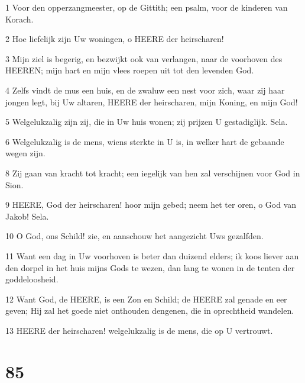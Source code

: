 \par 1 Voor den opperzangmeester, op de Gittith; een psalm, voor de kinderen van Korach.
\par 2 Hoe liefelijk zijn Uw woningen, o HEERE der heirscharen!
\par 3 Mijn ziel is begerig, en bezwijkt ook van verlangen, naar de voorhoven des HEEREN; mijn hart en mijn vlees roepen uit tot den levenden God.
\par 4 Zelfs vindt de mus een huis, en de zwaluw een nest voor zich, waar zij haar jongen legt, bij Uw altaren, HEERE der heirscharen, mijn Koning, en mijn God!
\par 5 Welgelukzalig zijn zij, die in Uw huis wonen; zij prijzen U gestadiglijk. Sela.
\par 6 Welgelukzalig is de mens, wiens sterkte in U is, in welker hart de gebaande wegen zijn.
\par 8 Zij gaan van kracht tot kracht; een iegelijk van hen zal verschijnen voor God in Sion.
\par 9 HEERE, God der heirscharen! hoor mijn gebed; neem het ter oren, o God van Jakob! Sela.
\par 10 O God, ons Schild! zie, en aanschouw het aangezicht Uws gezalfden.
\par 11 Want een dag in Uw voorhoven is beter dan duizend elders; ik koos liever aan den dorpel in het huis mijns Gods te wezen, dan lang te wonen in de tenten der goddeloosheid.
\par 12 Want God, de HEERE, is een Zon en Schild; de HEERE zal genade en eer geven; Hij zal het goede niet onthouden dengenen, die in oprechtheid wandelen.
\par 13 HEERE der heirscharen! welgelukzalig is de mens, die op U vertrouwt.

\chapter{85}

